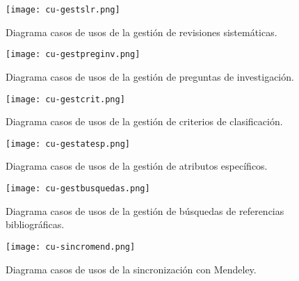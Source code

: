\begin{figure}[hp!]
	\begin{center}
		\texttt{[image: cu-gestslr.png]}
		\caption{Diagrama casos de usos de la gestión de revisiones sistemáticas.}
		\label{fig:cu03}
	\end{center}
\end{figure}

\begin{figure}[hp!]
	\begin{center}
		\texttt{[image: cu-gestpreginv.png]}
		\caption{Diagrama casos de usos de la gestión de preguntas de investigación.}
		\label{fig:cu04}
	\end{center}
\end{figure}

\begin{figure}[hp!]
	\begin{center}
		\texttt{[image: cu-gestcrit.png]}
		\caption{Diagrama casos de usos de la gestión de criterios de clasificación.}
		\label{fig:cu05}
	\end{center}
\end{figure}

\begin{figure}[hp!]
	\begin{center}
		\texttt{[image: cu-gestatesp.png]}
		\caption{Diagrama casos de usos de la gestión de atributos específicos.}
		\label{fig:cu06}
	\end{center}
\end{figure}

\begin{figure}[hp!]
	\begin{center}
		\texttt{[image: cu-gestbusquedas.png]}
		\caption{Diagrama casos de usos de la gestión de búsquedas de referencias bibliográficas.}
		\label{fig:cu07}
	\end{center}
\end{figure}

\newpage

\begin{figure}[hp!]
	\begin{center}
		\texttt{[image: cu-sincromend.png]}
		\caption{Diagrama casos de usos de la sincronización con Mendeley.}
		\label{fig:cu08}
	\end{center}
\end{figure}

